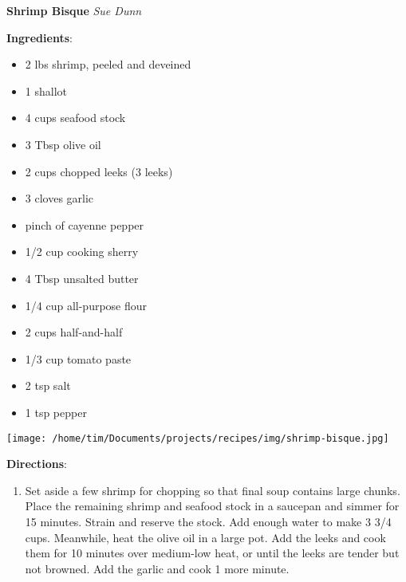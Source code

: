 \documentclass[11pt, twoside, openany]{book}
\begin{document}
\noindent\begin{minipage}[t]{\linewidth}%
{\Large\textbf{Shrimp Bisque}} \label{shrimp-bisque}\hfill\textit{Sue Dunn}\\
\noindent\begin{minipage}[t]{0.78\linewidth}%
\textbf{Ingredients}:\vspace{-3mm}
\begin{multicols}{2}
\begin{itemize}\setlength\itemsep{-1mm}
\item 2 lbs shrimp, peeled and deveined
\item 1 shallot
\item 4 cups seafood stock
\item 3 Tbsp olive oil
\item 2 cups chopped leeks (3 leeks)
\item 3 cloves garlic
\item pinch of cayenne pepper
\item 1/2 cup cooking sherry
\item 4 Tbsp unsalted butter
\item 1/4 cup all-purpose flour
\item 2 cups half-and-half
\item 1/3 cup tomato paste
\item 2 tsp salt
\item 1 tsp pepper
\end{itemize}
\end{multicols}
\end{minipage}
\noindent\begin{minipage}[t]{0.18\linewidth}
\centering \strut\vspace*{-\baselineskip}\newline
\texttt{[image: /home/tim/Documents/projects/recipes/img/shrimp-bisque.jpg]}\\
\end{minipage}\vspace{3mm}
\textbf{Directions}:
\vspace{-3mm}\begin{enumerate}\setlength\itemsep{-1mm}
\item Set aside a few shrimp for chopping so that final soup contains large chunks. Place the remaining shrimp and seafood stock in a saucepan and simmer for 15 minutes. Strain and reserve the stock. Add enough water to make 3 3/4 cups. Meanwhile, heat the olive oil in a large pot. Add the leeks and cook them for 10 minutes over medium-low heat, or until the leeks are tender but not browned. Add the garlic and cook 1 more minute.

\end{enumerate}
\end{minipage}
\end{document}
